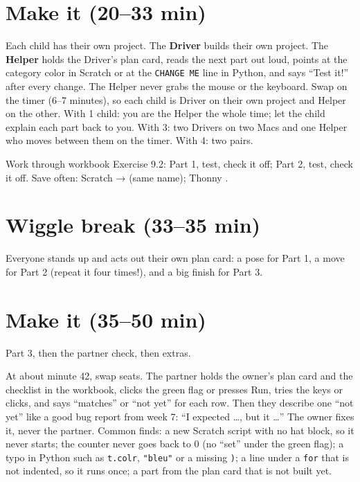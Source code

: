 \section{Make it (20--33 min)}
\begin{pairroles}
Each child has their own project. The \textbf{Driver} builds their own project. The \textbf{Helper} holds the Driver's plan card, reads the next part out loud, points at the category color in Scratch or at the \texttt{CHANGE ME} line in Python, and says \enquote{Test it!} after every change. The Helper never grabs the mouse or the keyboard. Swap on the timer (6--7 minutes), so each child is Driver on their own project and Helper on the other. With 1 child: you are the Helper the whole time; let the child explain each part back to you. With 3: two Drivers on two Macs and one Helper who moves between them on the timer. With 4: two pairs.
\end{pairroles}

Work through workbook Exercise 9.2: Part 1, test, check it off; Part 2, test, check it off. Save often: Scratch  →  (same name); Thonny .

\section{Wiggle break (33--35 min)}
Everyone stands up and acts out their own plan card: a pose for Part 1, a move for Part 2 (repeat it four times!), and a big finish for Part 3.

\section{Make it (35--50 min)}
Part 3, then the partner check, then extras.

\begin{bughunt}
At about minute 42, swap seats. The partner holds the owner's plan card and the checklist in the workbook, clicks the green flag or presses Run, tries the keys or clicks, and says \enquote{matches} or \enquote{not yet} for each row. Then they describe one \enquote{not yet} like a good bug report from week 7: \enquote{I expected \ldots, but it \ldots} The owner fixes it, never the partner. Common finds: a new Scratch script with no hat block, so it never starts; the counter never goes back to 0 (no \enquote{set} under the green flag); a typo in Python such as \texttt{t.colr}, \texttt{"bleu"} or a missing \texttt{)}; a line under a \texttt{for} that is not indented, so it runs once; a part from the plan card that is not built yet.
\end{bughunt}

